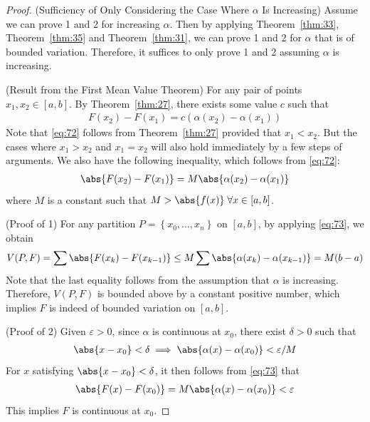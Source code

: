 \documentclass[thmcnt=section, 12pt]{elegantbook}
\begin{document}
\begin{proof}
    (Sufficiency of Only Considering the Case Where $\alpha$ Is Increasing) Assume we can prove 1 and 2 for increasing $\alpha$. Then by applying Theorem~\ref{thm:33}, Theorem~\ref{thm:35} and Theorem~\ref{thm:31}, we can prove 1 and 2 for $\alpha$ that is of bounded variation. Therefore, it suffices to only prove 1 and 2 assuming $\alpha$ is increasing.

    \par (Result from the First Mean Value Theorem) For any pair of points $x_1, x_2 \in [a, b]$. By Theorem~\ref{thm:27}, there exists some value $c$ such that 
    \begin{align}
        F(x_2) - F(x_1)
        = c (\alpha(x_2) - \alpha(x_1))
        \label{eq:72}
    \end{align}
    Note that \eqref{eq:72} follows from Theorem~\ref{thm:27} provided that $x_1 < x_2$. But the cases where $x_1 > x_2$ and $x_1 = x_2$ will also hold immediately by a few steps of arguments. We also have the following inequality, which follows from \eqref{eq:72}:
    \begin{align}
        \abs{F(x_2) - F(x_1)}
        = M \abs{\alpha(x_2) - \alpha(x_1)}
        \label{eq:73}
    \end{align}
    where $M$ is a constant such that $M > \abs{f(x)} \; \forall x \in [a, b]$.

    \par (Proof of 1) For any partition $P = \left\{x_0, \ldots, x_n\right\}$ on $[a, b]$, by applying \eqref{eq:73}, we obtain
    \begin{align*}
        V(P, F) = \sum \abs{F(x_k) - F( x_{k-1})}
        \leq M \sum \abs{\alpha(x_k) - \alpha(x_{k-1})}
        = M (b-a)
    \end{align*}
    Note that the last equality follows from the assumption that $\alpha$ is increasing. Therefore, $V(P, F)$ is bounded above by a constant positive number, which implies $F$ is indeed of bounded variation on $[a, b]$.

    \par (Proof of 2) Given $\varepsilon > 0$, since $\alpha$ is continuous at $x_0$, there exist $\delta > 0$ such that
    \begin{align*}
        \abs{x - x_0} < \delta 
        \implies \abs{\alpha(x) - \alpha(x_0)} < \varepsilon / M
    \end{align*}
    For $x$ satisfying $\abs{x - x_0} < \delta$, it then follows from \eqref{eq:73} that 
    \begin{align*}
        \abs{F(x) - F(x_0)}
        = M \abs{\alpha(x) - \alpha(x_0)}
        < \varepsilon
    \end{align*}
    This implies $F$ is continuous at $x_0$.


\end{proof}
\end{document}
